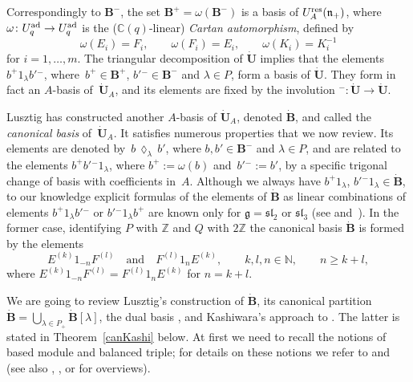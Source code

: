 \documentclass[10pt,a4paper]{amsart}
\numberwithin{equation}{section}
\theoremstyle{definition}
\newcommand{\mc}{\mathbb{C}}
\newcommand{\mz}{\mathbb{Z}}
\newcommand{\mn}{\mathbb{N}}
\newcommand{\ra}{\rightarrow}
\begin{document}
Correspondingly to $\mathbf{B}^-$, the set $\mathbf{B}^+ = \omega(\mathbf{B}^-)$ is a basis of $U_A^{\rm res}(\mathfrak{n}_+)$, where $\omega\colon U_q^{\rm ad} \ra U_q^{\rm ad}$ is the ($\mc(q)$-linear) {\it Cartan automorphism}, defined by
\[\omega(E_i)=F_i , \qquad \omega(F_i) = E_i , \qquad \omega(K_i)=K_i^{-1}\]
for $i=1,\dots,m$. The triangular decomposition of $\dot{\mathbf{U}}$ implies that the elements $b^+1_\lambda b'{}^-$, where~${b^+ \in \mathbf{B}^+}$, $b'{}^- \in \mathbf{B}^-$ and $\lambda\in P$, form a basis of $\dot{\mathbf{U}}$. They form in fact an $A$-basis of~$\dot{\mathbf{U}}_A$, and its elements are fixed by the involution ${}^-\colon \dot{\mathbf{U}} {}\ra{} \dot{\mathbf{U}}$.

Lusztig has constructed another $A$-basis of $\dot{\mathbf{U}}_A$, denoted $\dot{\mathbf{B}}$, and called the {\it canonical basis} of~$\dot{\mathbf{U}}_A$. It satisfies numerous properties that we now review. Its elements are denoted by~${b\,\lozenge_\lambda\, b'}$, where $b, b' \in \mathbf{B}^-$ and $\lambda\in P$, and are related to the elements $b^+b'{}^-1_\lambda$, where $b^+ := \omega(b)$ and~${b'{}^-:=b'}$, by a specific trigonal change of basis with coefficients in~$A$. Although we always have $b^+1_\lambda$, $b'{}^-1_\lambda \in \dot{\mathbf{B}}$, to our knowledge explicit formulas of the elements of $\dot{\mathbf{B}}$ as linear combinations of elements $b^+1_\lambda b'{}^-$ or $b'{}^- 1_\lambda b^+$ are known only for $\mathfrak{g}={\mathfrak{sl}_2}$ or $\mathfrak{sl}_3$ (see \cite[Section~25.3]{Lusztig} and~\cite{Cui}). In the former case, identifying $P$ with $\mz$ and $Q$ with $2\mz$ the canonical basis $\dot{\mathbf{B}}$ is formed by the elements
\[%
E^{(k)}1_{-n}F^{(l)}\quad \text{and}\quad F^{(l)}1_nE^{(k)}, \qquad k,l,n\in \mn,\qquad n\geq k+l,
\]
where $E^{(k)}1_{-n}F^{(l)} = F^{(l)}1_nE^{(k)}$ for $n=k+l$.

We are going to review Lusztig's construction of $\dot{\mathbf{B}}$, its canonical partition $\dot{\mathbf{B}} = \bigcup_{\lambda\in P_+} \dot{\mathbf{B}} [\lambda]$, the dual basis , and Kashiwara's approach to  \cite{Kashiwara2,Kashiwara3}. The latter is stated in Theorem~\ref{canKashi} below. At first we need to recall the notions of based module and balanced triple; for details on these notions we refer to \cite[Chapter~27]{Lusztig} and \cite{Kashiwara2} (see also \cite{Kashiwara4}, \cite[Sections~3.15 and~3.16]{VY}, or \cite[Chapter~14]{CP} for overviews).
\end{document}
